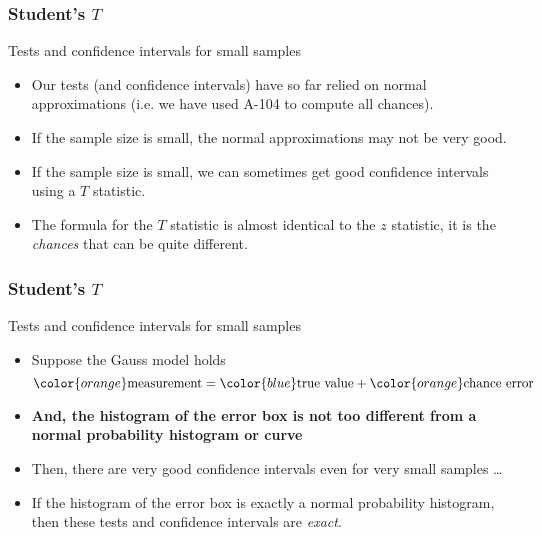 \documentclass[handout]{beamer}
\begin{document}

   \begin{frame} \frametitle{Student's $T$}

   \begin{block}
   {Tests and confidence intervals for small samples}
   \begin{itemize}

   \item Our tests (and confidence intervals) have so far
   relied on normal approximations  (i.e. we have used A-104 to compute
   all chances).

   \item If the sample size is small, the normal approximations may
   not be very good.

   \item If the sample size is small, we can sometimes get
   good confidence intervals using a $T$ statistic.

   \item The formula for the $T$ statistic is almost identical
   to the $z$ statistic, it is the {\em chances} that can be quite different.

   \end{itemize}
   \end{block}
   \end{frame}


   \begin{frame} \frametitle{Student's $T$}

   \begin{block}
   {Tests and confidence intervals for small samples}
   \begin{itemize}

   \item Suppose the Gauss model holds
     $$
     {\color{orange} \text{measurement}} = {\color{blue} \text{true value}} + {\color{orange} \text{chance error}}
     $$
   \item {\bf And, the histogram of the error box is not too different
   from a normal probability histogram or curve}

   \item Then, there are very good confidence intervals
   even for very small samples \dots

   \item If the histogram of the error box is exactly
   a normal probability histogram, then these tests and confidence
   intervals are {\em exact}.
   \end{itemize}
   \end{block}
   \end{frame}
\end{document}

